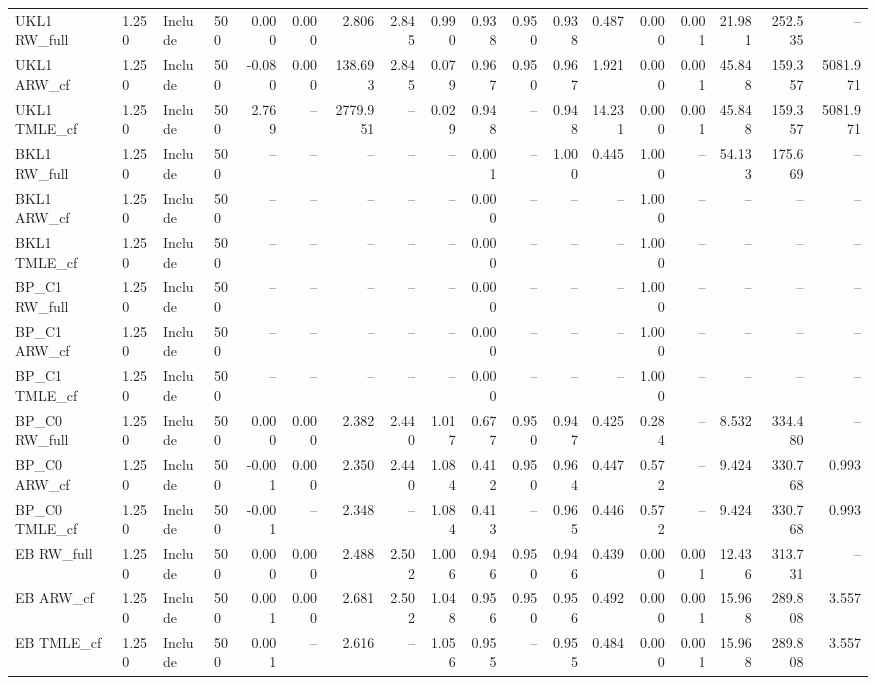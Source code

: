 \begin{tabular}{llllrrrrrrrrrrrrrr}
UKL1 RW\_full & 1.250 & Include & 500 & 0.000 & 0.000 & 2.806 & 2.845 & 0.990 & 0.938 & 0.950 & 0.938 & 0.487 & 0.000 & 0.001 & 21.981 & 252.535 & -- \\
UKL1 ARW\_cf & 1.250 & Include & 500 & -0.080 & 0.000 & 138.693 & 2.845 & 0.079 & 0.967 & 0.950 & 0.967 & 1.921 & 0.000 & 0.001 & 45.848 & 159.357 & 5081.971 \\
UKL1 TMLE\_cf & 1.250 & Include & 500 & 2.769 & -- & 2779.951 & -- & 0.029 & 0.948 & -- & 0.948 & 14.231 & 0.000 & 0.001 & 45.848 & 159.357 & 5081.971 \\
BKL1 RW\_full & 1.250 & Include & 500 & -- & -- & -- & -- & -- & 0.001 & -- & 1.000 & 0.445 & 1.000 & -- & 54.133 & 175.669 & -- \\
BKL1 ARW\_cf & 1.250 & Include & 500 & -- & -- & -- & -- & -- & 0.000 & -- & -- & -- & 1.000 & -- & -- & -- & -- \\
BKL1 TMLE\_cf & 1.250 & Include & 500 & -- & -- & -- & -- & -- & 0.000 & -- & -- & -- & 1.000 & -- & -- & -- & -- \\
BP\_C1 RW\_full & 1.250 & Include & 500 & -- & -- & -- & -- & -- & 0.000 & -- & -- & -- & 1.000 & -- & -- & -- & -- \\
BP\_C1 ARW\_cf & 1.250 & Include & 500 & -- & -- & -- & -- & -- & 0.000 & -- & -- & -- & 1.000 & -- & -- & -- & -- \\
BP\_C1 TMLE\_cf & 1.250 & Include & 500 & -- & -- & -- & -- & -- & 0.000 & -- & -- & -- & 1.000 & -- & -- & -- & -- \\
BP\_C0 RW\_full & 1.250 & Include & 500 & 0.000 & 0.000 & 2.382 & 2.440 & 1.017 & 0.677 & 0.950 & 0.947 & 0.425 & 0.284 & -- & 8.532 & 334.480 & -- \\
BP\_C0 ARW\_cf & 1.250 & Include & 500 & -0.001 & 0.000 & 2.350 & 2.440 & 1.084 & 0.412 & 0.950 & 0.964 & 0.447 & 0.572 & -- & 9.424 & 330.768 & 0.993 \\
BP\_C0 TMLE\_cf & 1.250 & Include & 500 & -0.001 & -- & 2.348 & -- & 1.084 & 0.413 & -- & 0.965 & 0.446 & 0.572 & -- & 9.424 & 330.768 & 0.993 \\
EB RW\_full & 1.250 & Include & 500 & 0.000 & 0.000 & 2.488 & 2.502 & 1.006 & 0.946 & 0.950 & 0.946 & 0.439 & 0.000 & 0.001 & 12.436 & 313.731 & -- \\
EB ARW\_cf & 1.250 & Include & 500 & 0.001 & 0.000 & 2.681 & 2.502 & 1.048 & 0.956 & 0.950 & 0.956 & 0.492 & 0.000 & 0.001 & 15.968 & 289.808 & 3.557 \\
EB TMLE\_cf & 1.250 & Include & 500 & 0.001 & -- & 2.616 & -- & 1.056 & 0.955 & -- & 0.955 & 0.484 & 0.000 & 0.001 & 15.968 & 289.808 & 3.557 \\

\end{tabular}
